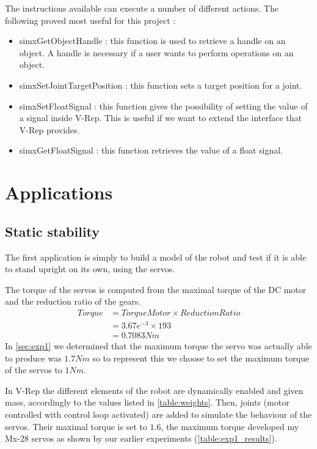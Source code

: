 The instructions available can execute a number of different actions. The following proved most useful for this project :\begin{itemize}
\item simxGetObjectHandle : this function is used to retrieve a handle on an object. A handle is necessary if a user wants to perform operations on an object.
\item simxSetJointTargetPosition : this function sets a target position for a joint.
\item simxSetFloatSignal : this function gives the possibility of setting the value of a signal inside V-Rep. This is useful if we want to extend the interface that V-Rep provides.
\item simxGetFloatSignal : this function retrieves the value of a float signal. 
\end{itemize}



\section{Applications}
\subsection{Static stability}
The first application is simply to build a model of the robot and test if it is able to stand upright on its own, using the servos.

The torque of the servos is computed from the maximal torque of the DC motor and the reduction ratio of the gears. 
\begin{align*}
Torque &= TorqueMotor \times ReductionRatio\\
&= 3.67e^{-3} \times 193\\
&= 0.7083Nm
\end{align*}
In \cref{sec:exp1} we determined that the maximum torque the servo was actually able to produce was $1.7Nm$ so to represent this we choose to set the maximum torque of the servos to $1Nm$.

In V-Rep the different elements of the robot are dynamically enabled and given mass, accordingly to the values listed in \cref{table:weights}. Then, joints (motor controlled with control loop activated) are added to simulate the behaviour of the servos. Their maximal torque is set to $1.6$, the maximum torque developed my Mx-28 servos as shown by our earlier experiments (\cref{table:exp1_results}). 

